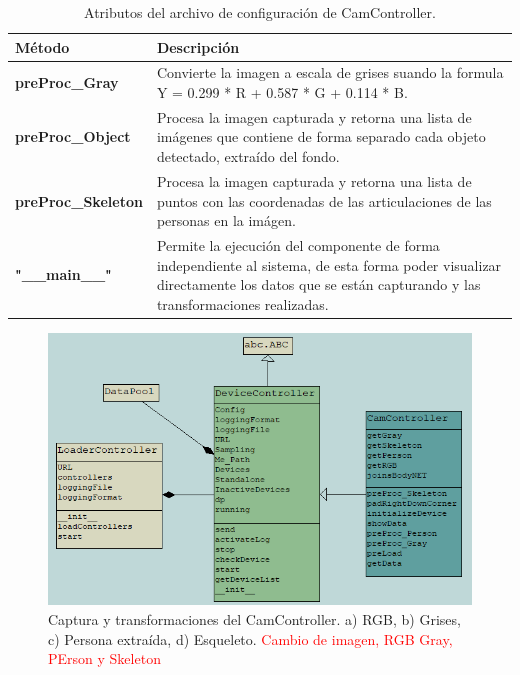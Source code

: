     \begin{table}[ht!]
    \caption[Archivo de configuración de CamController]{Atributos del archivo de configuración de CamController.}
    \label{Tab:CamControllerOwnMethods}
    \centering
    \begin{tabular}{ | l p{8cm} | } 
        \hline
        \textbf{Método}         & \textbf{Descripción} \\ 
        \hline\hline
        \textbf{preProc\_Gray}     & Convierte la imagen a escala de grises suando la formula Y = 0.299 * R + 0.587 * G + 0.114 * B.\\
        \hline
        \textbf{preProc\_Object}   & Procesa la imagen capturada y retorna una lista de imágenes que contiene de forma separado cada objeto detectado, extraído del fondo.\\
        \hline
        \textbf{preProc\_Skeleton} & Procesa la imagen capturada y retorna una lista de puntos con las coordenadas de las articulaciones de las personas en la imágen.\\
        \hline
        \textbf{"\_\_main\_\_"}    & Permite la ejecución del componente de forma independiente al sistema, de esta forma poder visualizar directamente los datos que se están capturando y las transformaciones realizadas.\\
        \hline
    \end{tabular}
    \end{table}
    
    \begin{figure}[ht!]
    	\centering
    	\includegraphics[width=0.9\linewidth]{imgs/04-Construction/04-ControllerClassModel.PNG}
    	\caption[Captura y transformaciones del CamController]{Captura y transformaciones del CamController. a) RGB, b) Grises, c) Persona extraída, d) Esqueleto. \textcolor{red}{Cambio de imagen, RGB Gray, PErson y Skeleton}}
    	
	    \label{fig:CamControllerTransGetData}
    \end{figure}%
    
